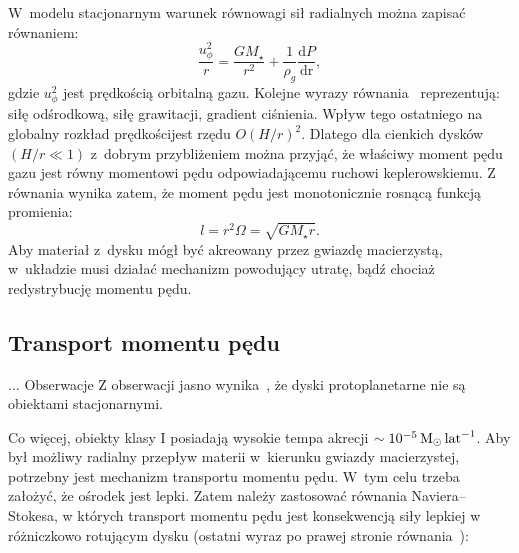 %
\par W~modelu stacjonarnym warunek równowagi sił radialnych można zapisać
równaniem:
%
\begin{equation}\label{eq:radial_balance}
\frac{u_\phi^2}{r} = \frac{GM_\star}{r^2} +
  \frac{1}{\rho_g}\frac{\textrm{d}P}{\textrm{dr}},
\end{equation}
gdzie $u_\phi^2$ jest prędkością orbitalną gazu.  Kolejne wyrazy
równania~ reprezentują: siłę odśrodkową, siłę
grawitacji, gradient ciśnienia. Wpływ tego ostatniego na globalny rozkład
prędkościjest rzędu $O(H/r)^2$. Dlatego dla cienkich dysków $(H/r \ll 1)$
z~dobrym przybliżeniem można przyjąć, że właściwy moment pędu gazu jest równy
momentowi pędu odpowiadającemu ruchowi keplerowskiemu. Z równania
 wynika zatem, że moment pędu jest monotonicznie rosnącą
funkcją promienia:
%
\begin{equation}\label{eq:angmom}
l = r^2\Omega = \sqrt{GM_\star r}.
\end{equation}
%
Aby materiał z~dysku mógł być akreowany przez gwiazdę macierzystą, w~układzie
musi działać mechanizm powodujący utratę, bądź chociaż redystrybucję momentu
pędu.

\subsection{Transport momentu pędu}
$\ldots$
Obserwacje 
Z obserwacji jasno wynika~\citep{MME04}, że dyski protoplanetarne nie są
obiektami stacjonarnymi. 

Co więcej, obiekty klasy I posiadają wysokie tempa
akrecji $\sim 10^{-5}\hbox{$\mathrm{\thinspace M_{\odot}}$}\hbox{$\thinspace\textrm{lat}$}^{-1}$. Aby był możliwy radialny przepływ materii
w~kierunku gwiazdy macierzystej, potrzebny jest mechanizm transportu momentu
pędu. W~tym celu trzeba założyć, że ośrodek jest lepki. Zatem należy zastosować
równania Naviera--Stokesa, w których transport momentu pędu jest konsekwencją
siły lepkiej w różniczkowo rotującym dysku (ostatni wyraz po prawej stronie
równania~):

